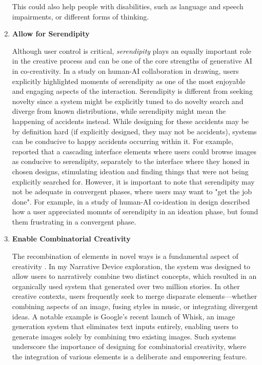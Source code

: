 \begin{enumerate}
This could also help people with disabilities, such as language and speech impairments, or different forms of thinking. 


\item \textbf{Allow for Serendipity}

Although user control is critical, \textit{serendipity} plays an equally important role in the creative process and can be one of the core strengths of generative AI in co-creativity. In a study on human-AI collaboration in drawing, users explicitly highlighted moments of serendipity as one of the most enjoyable and engaging aspects of the interaction. Serendipity is different from seeking novelty since a system might be explicitly tuned to do novelty search and diverge from known distributions, while serendipity might mean the happening of accidents instead. While designing for these accidents may be by definition hard (if explicitly designed, they may not be accidents), systems can be conducive to happy accidents occurring within it. For example, \cite{Koch2020-gx} reported that a cascading interface elements where users could browse images as conducive to serendipity, separately to the interface where they honed in chosen designs, stimulating ideation and finding things that were not being explicitly searched for. However, it is important to note that serendipity may not be adequate in convergent phases, where users may want to "get the job done". For example, in a study of human-AI co-ideation in design \cite{Chiou2023-vr} described how a user appreciated momnts of serendipity in an ideation phase, but found them frustrating in a convergent phase. 

    
\item \textbf{Enable Combinatorial Creativity}

The recombination of elements in novel ways is a fundamental aspect of creativity \cite{Boden1998-yn}. In my Narrative Device exploration, the system was designed to allow users to narratively combine two distinct concepts, which resulted in an organically used system that generated over two million stories. In other creative contexts, users frequently seek to merge disparate elements---whether combining aspects of an image, fusing styles in music, or integrating divergent ideas. A notable example is Google’s recent launch of Whisk, an image generation system that eliminates text inputs entirely, enabling users to generate images solely by combining two existing images. Such systems underscore the importance of designing for combinatorial creativity, where the integration of various elements is a deliberate and empowering feature.

    
\end{enumerate}



